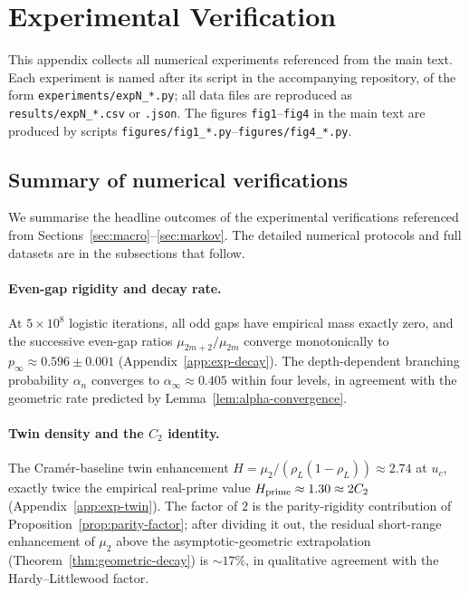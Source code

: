 
\section{Experimental Verification}
\label{app:exp}

This appendix collects all numerical experiments referenced from the
main text. Each experiment is named after its script in the
accompanying repository, of the form \texttt{experiments/expN\_*.py};
all data files are reproduced as \texttt{results/expN\_*.csv} or
\texttt{.json}. The figures \texttt{fig1}--\texttt{fig4} in the main
text are produced by scripts \texttt{figures/fig1\_*.py}--\texttt{figures/fig4\_*.py}.

\subsection{Summary of numerical verifications}
\label{app:exp-summary}

We summarise the headline outcomes of the experimental verifications
referenced from Sections~\ref{sec:macro}--\ref{sec:markov}. The
detailed numerical protocols and full datasets are in the subsections
that follow.

\paragraph{Even-gap rigidity and decay rate.} At $5 \times 10^8$ logistic
iterations, all odd gaps have empirical mass exactly zero, and the
successive even-gap ratios $\mu_{2m+2}/\mu_{2m}$ converge monotonically
to $p_\infty \approx 0.596 \pm 0.001$ (Appendix~\ref{app:exp-decay}).
The depth-dependent branching probability $\alpha_n$ converges to
$\alpha_\infty \approx 0.405$ within four levels, in agreement with
the geometric rate predicted by Lemma~\ref{lem:alpha-convergence}.

\paragraph{Twin density and the $C_2$ identity.} The Cram\'er-baseline
twin enhancement $H = \mu_2 / (\rho_L (1 - \rho_L)) \approx 2.74$ at
$u_c$, exactly twice the empirical real-prime value
$H_{\rm prime} \approx 1.30 \approx 2 C_2$
(Appendix~\ref{app:exp-twin}). The factor of $2$ is the
parity-rigidity contribution of Proposition~\ref{prop:parity-factor};
after dividing it out, the residual short-range enhancement of
$\mu_2$ above the asymptotic-geometric extrapolation
(Theorem~\ref{thm:geometric-decay}) is $\sim 17\%$, in qualitative
agreement with the Hardy--Littlewood factor.

